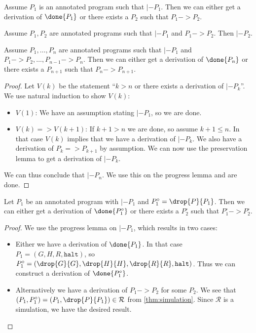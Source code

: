\begin{lemma}[Progress]
  \label{thm:progress}
  Assume $P_1$ is an annotated program such that $|- P_1$.
  Then we can either get a derivation of $\done{P_1}$ or there exists
  a $P_2$ such that $P_1 -> P_2$.
\end{lemma}

\begin{lemma}[Preservation]
  \label{thm:reduction}
  Assume $P_1, P_2$ are annotated programs such that $|- P_1$ and $P_1 ->
  P_2$. Then $|- P_2$.
\end{lemma}

\begin{lemma}[Soundness]
  \label{thm:soundness}
  Assume $P_1, \dots, P_n$ are annotated programs such that $|- P_1$ and
  $P_1 -> P_2, \dots, P_{n-1} -> P_n$. Then we can either get a derivation of
  $\done{P_n}$ or there exists a $P_{n+1}$ such that $P_n -> P_{n+1}$.
\end{lemma}
\begin{proof}
  Let $V(k)$ be the statement ``$k > n$ or there exists a derivation of
  $|- P_k$''. We use natural induction to show $V(k)$:

  \begin{itemize}
  \item $V(1)$: We have an assumption stating $|- P_1$, so we are done.
  \item $V(k) => V(k+1)$: If $k+1 > n$ we are done, so assume $k+1 \le n$. In
    that case $V(k)$ implies that we have a derivation of $|- P_k$. We also have
    a derivation of $P_k => P_{k+1}$ by assumption. We can now use the
    preservation lemma to get a derivation of $|- P_k$.
  \end{itemize}

  We can thus conclude that $|- P_n$. We use this on the progress lemma and are
  done.
\end{proof}

\begin{lemma}
  \label{thm:progress-simple}
  Let $P_1$ be an annotated program with $|- P_1$ and
  $P^\circ_1 = \drop{P}{P_1}$. Then we can either get a derivation of
  $\done{P^\circ_1}$ or there exists a $P^\circ_2$ such that
  $P^\circ_1 -> P^\circ_2$.
\end{lemma}
\begin{proof}
  We use the progress lemma on $|- P_1$, which results in two cases:

  \begin{itemize}
  \item Either we have a derivation of $\done{P_1}$. In that case
    $P_1 = (G, H, R, \mathtt{halt})$, so
    $P^\circ_1 = (\drop{G}{G}, \drop{H}{H}, \drop{R}{R}, \mathtt{halt})$. Thus
    we can construct a derivation of $\done{P^\circ_1}$.
  \item Alternatively we have a derivation of $P_1 -> P_2$ for some $P_2$. We
    see that $(P_1, P^\circ_1) = (P_1, \drop{P}{P_1}) \in \mathcal{R}$ from
    \autoref{thm:simulation}. Since $\mathcal{R}$ is a simulation, we have the
    desired result.
  \end{itemize}
\end{proof}

